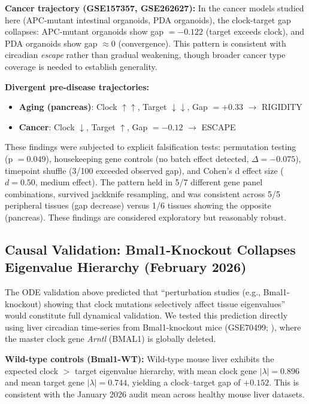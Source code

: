 \documentclass[11pt,a4paper]{article}
\begin{document}
\textbf{Cancer trajectory (GSE157357, GSE262627):} In the cancer models studied here (APC-mutant intestinal organoids, PDA organoids), the clock-target gap collapses: APC-mutant organoids show gap $= -0.122$ (target exceeds clock), and PDA organoids show gap $\approx 0$ (convergence). This pattern is consistent with circadian \textit{escape} rather than gradual weakening, though broader cancer type coverage is needed to establish generality.

\textbf{Divergent pre-disease trajectories:}
\begin{itemize}
    \item \textbf{Aging (pancreas)}: Clock $\uparrow\uparrow$, Target $\downarrow\downarrow$, Gap $= +0.33$ $\rightarrow$ RIGIDITY
    \item \textbf{Cancer}: Clock $\downarrow$, Target $\uparrow$, Gap $= -0.12$ $\rightarrow$ ESCAPE
\end{itemize}

These findings were subjected to explicit falsification tests: permutation testing (p $= 0.049$), housekeeping gene controls (no batch effect detected, $\Delta = -0.075$), timepoint shuffle (3/100 exceeded observed gap), and Cohen's d effect size ($d = 0.50$, medium effect). The pattern held in 5/7 different gene panel combinations, survived jackknife resampling, and was consistent across 5/5 peripheral tissues (gap decrease) versus 1/6 tissues showing the opposite (pancreas). These findings are considered exploratory but reasonably robust.

\subsection{Causal Validation: Bmal1-Knockout Collapses Eigenvalue Hierarchy (February 2026)}
\label{sec:bmal1ko_causal}

The ODE validation above predicted that ``perturbation studies (e.g., Bmal1-knockout) showing that clock mutations selectively affect tissue eigenvalues'' would constitute full dynamical validation. We tested this prediction directly using liver circadian time-series from Bmal1-knockout mice (GSE70499; \citet{storch2007daily}), where the master clock gene \textit{Arntl} (BMAL1) is globally deleted.

\textbf{Wild-type controls (Bmal1-WT):} Wild-type mouse liver exhibits the expected clock $>$ target eigenvalue hierarchy, with mean clock gene $|\lambda| = 0.896$ and mean target gene $|\lambda| = 0.744$, yielding a clock--target gap of $+0.152$. This is consistent with the January 2026 audit mean across healthy mouse liver datasets.
\end{document}
